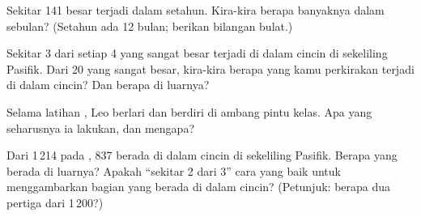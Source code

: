 \begin{exercise}[$\star\star$]\label{exo:g4:volcanoes-earthquakes-first-look:8}
Sekitar 141  besar terjadi dalam setahun. Kira-kira berapa
banyaknya dalam sebulan? (Setahun ada 12 bulan; berikan bilangan bulat.)
\end{exercise}

\begin{exercise}[$\star\star$]\label{exo:g4:volcanoes-earthquakes-first-look:9}
Sekitar 3 dari setiap 4  yang sangat besar terjadi di dalam
cincin di sekeliling  Pasifik. Dari 20  yang sangat besar,
kira-kira berapa yang kamu perkirakan terjadi di dalam cincin? Dan berapa
di luarnya?
\end{exercise}

\begin{exercise}[$\star\star$]\label{exo:g4:volcanoes-earthquakes-first-look:10}
Selama latihan , Leo berlari dan berdiri di ambang pintu kelas.
Apa yang seharusnya ia lakukan, dan mengapa?
\end{exercise}

\begin{exercise}[$\star\star\star$]\label{exo:g4:volcanoes-earthquakes-first-look:11}
Dari 1\,214  pada , 837 berada di dalam cincin di sekeliling
 Pasifik. Berapa yang berada di luarnya? Apakah ``sekitar 2 dari 3''
cara yang baik untuk menggambarkan bagian yang berada di dalam cincin?
(Petunjuk: berapa dua pertiga dari 1\,200?)
\end{exercise}
